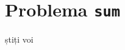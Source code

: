 \documentclass{scrartcl}
\author{Test -- Tutors of CNMB Informatică}
\date{4 februarie 2024}
\begin{document}
\section*{Problema \texttt{sum}}
știți voi
\end{document}
